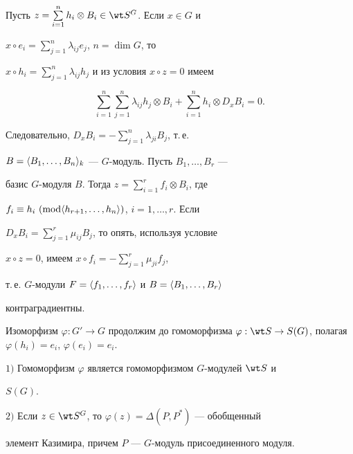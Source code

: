  


\begin{pf} 


Пусть $z=\sum\limits^n_{i=1}h_i\otimes B_i\in\wt S^G$. Если $x\in G$ и 


$x\circ e_i=\sum\limits^n_{j=1}\lambda_{ij}e_j$, $n=\dim G$, то 


$x\circ h_i=\sum\limits^n_{j=1}\lambda_{ij}h_j$ и из условия $x\circ 


z=0$ имеем 


$$ 


\sum^n_{i=1}\sum^n_{j=1}\lambda_{ij}h_j\otimes B_i+ 


\sum^n_{i=1}h_i\otimes D_x B_i=0. 


$$ 


Следовательно, $D_x B_i=-\sum\limits^n_{j=1}\lambda_{ji}B_j$, т.\,е. 


$B=\langle B_1,\dotsc,B_n\rangle_k$ --- $G$-модуль. Пусть $B_1,\dotsc,B_r$ --- 


базис $G$-модуля $B$. Тогда $z=\sum\limits^r_{i=1}f_i\otimes B_i$, где 


$f_i\equiv h_i\ (\operatorname{mod}\langle h_{r+1},\dotsc,h_n\rangle)$, $i=1,\dotsc,r$. Если 


$D_x B_i=\sum\limits^r_{j=1}\mu_{ij}B_j$, то опять, используя условие 


$x\circ z=0$, имеем $x\circ f_i=-\sum\limits^r_{j=1}\mu_{ji}f_j$, 


т.\,е. $G$-модули $F=\langle f_1,\dotsc,f_r\rangle$ и $B=\langle B_1,\dotsc,B_r\rangle$ 


контраградиентны. 


\end{pf} 


 


Изоморфизм $\varphi:G'\to G$ продолжим до гомоморфизма $\varphi:\wt 


S\to S(G)$, полагая $\varphi(h_i)=e_i$, $\varphi(e_i)=e_i$. 


 


\begin{lem} 


$1)$ Гомоморфизм $\varphi$ является гомоморфизмом $G$-модулей $\wt S$ и 


$S(G)$. 


 


$2)$ Если $z\in\wt S^G$, то $\varphi(z)=\Delta(P,P^*)$ --- обобщенный 


элемент Казимира, причем $P$ --- \linebreak $G$-модуль присоединенного модуля. 


\end{lem} 


